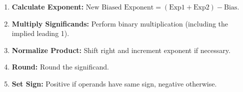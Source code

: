 \begin{proposition}
\begin{enumerate}
    \item \textbf{Calculate Exponent:} $\text{New Biased Exponent} = (\text{Exp1} + \text{Exp2}) - \text{Bias}$.
    \item \textbf{Multiply Significands:} Perform binary multiplication (including the implied leading 1).
    \item \textbf{Normalize Product:} Shift right and increment exponent if necessary.
    \item \textbf{Round:} Round the significand.
    \item \textbf{Set Sign:} Positive if operands have same sign, negative otherwise.
\end{enumerate}
\end{proposition}
